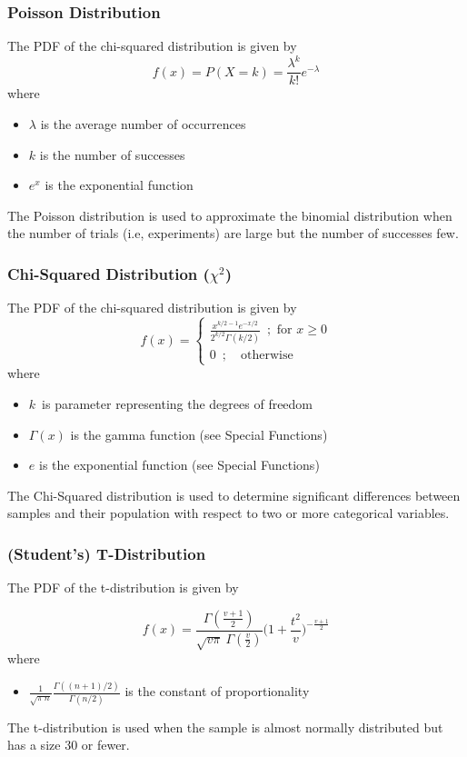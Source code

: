 \documentclass{article}
\begin{document}
\subsubsection{Poisson Distribution}
The PDF of the chi-squared distribution is given by
$$ f(x)=P(X=k)=\frac{\lambda^k}{k!}e^{-\lambda} $$
where
\begin{itemize}
    \item $\lambda$ is the average number of occurrences
    \item $k$ is the number of successes
    \item $e^x$ is the exponential function
\end{itemize}
\hfill \break
The Poisson distribution is used to approximate the binomial distribution when the number of trials (i.e, experiments) are large but the number of successes few.


\subsubsection{Chi-Squared Distribution ($\chi^2$)}
The PDF of the chi-squared distribution is given by
$$ f(x) = \begin{cases} \frac{ x^{k/2-1}e^{-x/2} }{ 2^{k/2} \Gamma(k/2) }
\enspace ; \text{ for }  x \geq 0  \\ 0 \enspace ; \quad \text{otherwise} \end{cases} $$ \hfill \break
where
\begin{itemize}
    \item $k$\ is parameter representing the degrees of freedom
    \item $\Gamma(x)$ is the gamma function (see Special Functions)
    \item $e$ is the exponential function (see Special Functions)
\end{itemize}

The Chi-Squared distribution is used to determine significant differences between samples and their population with respect to two or more categorical variables.

\subsubsection{(Student's) T-Distribution}

The PDF of the t-distribution is given by

$$ f(x) = \frac{ \Gamma (\frac{v+1}{2}) }{ \sqrt{v \pi} \: \Gamma (\frac{v}{2}) } \Big (1+ \frac{t^2}{v} \Big ) ^ {-\frac{v+1}{2}} $$ \hfill \break
where
\begin{itemize}
    \item $\frac{1}{\sqrt{\pi\:n}} \frac{\Gamma((n+1)/2)}{\Gamma(n/2)}$ is the constant of proportionality
\end{itemize}
\hfill \break
The t-distribution is used when the sample is almost normally distributed but has a size 30 or fewer.
\end{document}
